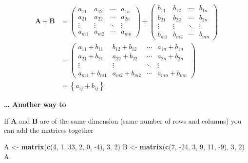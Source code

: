 \documentclass[
]{book}
\newenvironment{Shaded}{\begin{snugshade}}{\end{snugshade}}
\newcommand{\DecValTok}[1]{\textcolor[rgb]{0.00,0.00,0.81}{#1}}
\newcommand{\KeywordTok}[1]{\textcolor[rgb]{0.13,0.29,0.53}{\textbf{#1}}}
\newcommand{\NormalTok}[1]{#1}
\newcommand{\StringTok}[1]{\textcolor[rgb]{0.31,0.60,0.02}{#1}}
\theoremstyle{definition}
\theoremstyle{definition}
\theoremstyle{definition}
\theoremstyle{definition}
\theoremstyle{remark}
\begin{document}
\[
\begin{aligned}
\mathbf{A} + \mathbf{B} & = \begin{pmatrix} a_{11} & a_{12} & \cdots & a_{1n} \\
a_{21} & a_{22} & \cdots & a_{2n} \\
\vdots & \vdots & \ddots & \vdots \\
a_{m1} & a_{m2} & \cdots & a_{mn}
\end{pmatrix} + 
\begin{pmatrix} b_{11} & b_{12} & \cdots & b_{1n} \\
b_{21} & b_{22} & \cdots & b_{2n} \\
\vdots & \vdots & \ddots & \vdots \\
b_{m1} & b_{m2} & \cdots & b_{mn}
\end{pmatrix} \\
& = \begin{pmatrix} a_{11} + b_{11} & b_{12} + b_{12} & \cdots & a_{1n} + b_{1n} \\
a_{21} + b_{21} & a_{22} + b_{22} & \cdots & a_{2n} + b_{2n} \\
\vdots & \vdots & \ddots & \vdots \\
a_{m1} + b_{m1} & a_{m2} + b_{m2} & \cdots & a_{mn} + b_{mn}
\end{pmatrix} \\
& = \left\{ a_{ij} + b_{ij} \right\}
\end{aligned}
\label{eq:matrix-addition}
\]

\textbf{\ldots{} Another way to }

If \(\mathbf{A}\) and \(\mathbf{B}\) are of the same dimension (same number of rows and columns) you can add the matrices together

\begin{Shaded}
\begin{Highlighting}[]
\NormalTok{A <-}\StringTok{ }\KeywordTok{matrix}\NormalTok{(}\KeywordTok{c}\NormalTok{(}\DecValTok{4}\NormalTok{, }\DecValTok{1}\NormalTok{, }\DecValTok{33}\NormalTok{, }\DecValTok{2}\NormalTok{, }\DecValTok{0}\NormalTok{, }\DecValTok{-4}\NormalTok{), }\DecValTok{3}\NormalTok{, }\DecValTok{2}\NormalTok{)}
\NormalTok{B <-}\StringTok{ }\KeywordTok{matrix}\NormalTok{(}\KeywordTok{c}\NormalTok{(}\DecValTok{7}\NormalTok{, }\DecValTok{-24}\NormalTok{, }\DecValTok{3}\NormalTok{, }\DecValTok{9}\NormalTok{, }\DecValTok{11}\NormalTok{, }\DecValTok{-9}\NormalTok{), }\DecValTok{3}\NormalTok{, }\DecValTok{2}\NormalTok{)}
\NormalTok{A}
\end{Highlighting}
\end{Shaded}
\end{document}
